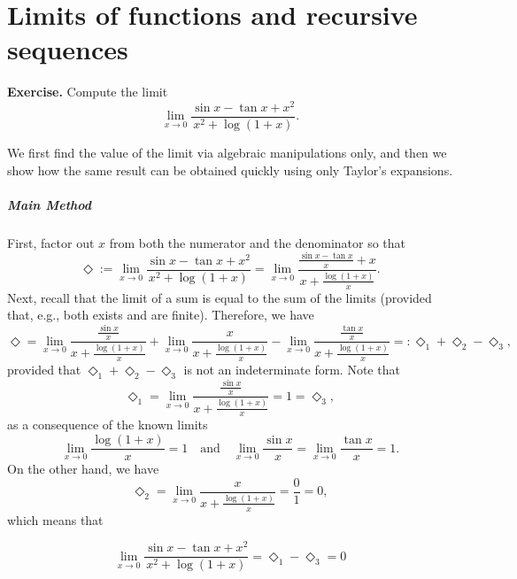 \documentclass[a4paper,10 pt]{report}
\newcommand{\finalanswer}[1]{%
    \begin{finalAnswer}
    \[
        #1
    \]
    \end{finalAnswer}
}
\theoremstyle{definition}
\begin{document}
\chapter{Limits of functions and recursive sequences}

\begin{exerciseBox}\textbf{Exercise.} Compute the limit
\begin{equation*} \lim_{x \to 0} \frac{\sin x - \tan x + x^2}{x^2 + \log(1 + x)}. \end{equation*}
\end{exerciseBox}

\begin{solutionBox} 
We first find the value of the limit via algebraic manipulations only, and then we show how the same result can be obtained quickly using only Taylor's expansions.

\paragraph{Main Method} First, factor out $x$ from both the numerator and the denominator so that
\begin{equation*} \Diamond := \lim_{x \to 0} \frac{\sin x - \tan x + x^2}{x^2 + \log(1 + x)} = \lim_{x \to 0} \frac{\frac{\sin x - \tan x}{x} + x}{x + \frac{\log(1 + x)}{x}}. \end{equation*}
Next, recall that the limit of a sum is equal to the sum of the limits (provided that, e.g., both exists and are finite). Therefore, we have
\begin{equation*} \Diamond =  \lim_{x \to 0} \frac{\frac{\sin x}{x}}{x + \frac{\log(1 + x)}{x}} + \lim_{x \to 0} \frac{x}{x + \frac{\log(1 + x)}{x}} -  \lim_{x \to 0} \frac{\frac{\tan x}{x}}{x + \frac{\log(1 + x)}{x}}=: \Diamond_1 + \Diamond_2 - \Diamond_3, \end{equation*}
provided that $\Diamond_1 + \Diamond_2 - \Diamond_3$ is not an indeterminate form. Note that
\begin{equation*} \Diamond_1 =  \lim_{x \to 0} \frac{\frac{\sin x}{x}}{x + \frac{\log(1 + x)}{x}} = 1 = \Diamond_3, \end{equation*}
as a consequence of the known limits
\begin{equation*} \lim_{x \to 0} \frac{\log(1 + x)}{x} = 1 \quad \text{and} \quad \lim_{x \to 0} \frac{\sin x}{x} = \lim_{x \to 0} \frac{\tan x}{x} = 1. \end{equation*}
On the other hand, we have
\begin{equation*} \Diamond_2 =  \lim_{x \to 0} \frac{x}{x + \frac{\log(1 + x)}{x}} = \frac{0}{1} = 0, \end{equation*}
which means that
\finalanswer{\lim_{x \to 0} \frac{\sin x - \tan x + x^2}{x^2 + \log(1 + x)} = \Diamond_1 - \Diamond_3 = 0}


\end{solutionBox}
\end{document}
